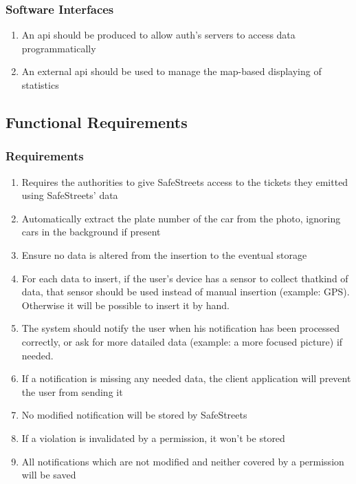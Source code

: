 \documentclass{article}
\newcommand{\enum}[1]{\texttt{#1.\arabic*}}
\begin{document}
		\subsubsection{Software Interfaces}
			\begin{enumerate}[label=\enum{SW}]
				\item \label{SW:Internal api} An api should be produced to allow auth's servers to access data programmatically
				\item \label{SW:map api} An external api should be used to manage the map-based displaying of statistics
			\end{enumerate}
			
	\subsection{Functional Requirements} 
			
		\subsubsection{Requirements}
		
			\begin{enumerate}[label=\enum{R}]
				\item \label{R:storeTickets}Requires the authorities to give SafeStreets access to the tickets they emitted using SafeStreets' data
				\item \label{R:autoPlate}Automatically extract the plate number of the car from the photo, ignoring cars in the background if present
				\item \label{R:unalteredData}Ensure no data is altered from the insertion to the eventual storage
				\item \label{R:dataGather}For each data to insert, if the  user's device has a sensor to collect thatkind of data, that sensor should be used instead of manual insertion (example: GPS). Otherwise it will be possible to insert it by hand.
				\item \label{R:notifyUser}The system should notify the user when his notification has been processed correctly, or ask for more datailed data (example: a more focused picture) if needed.
				\item \label{R:fullData}If a notification is missing any needed data, the client application will prevent the user from sending it
				\item \label{R:modifiedNotStored}No modified notification will be stored by SafeStreets
				\item \label{R:validPermissionNotStored}If a violation is invalidated by a permission, it won't be stored
				\item \label{R:legitNotificationsAlwaysStored}All notifications which are not modified and neither covered by a permission will be saved
			\end{enumerate}
				
\end{document}
